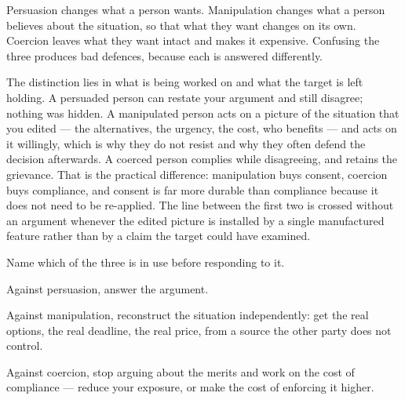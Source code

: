


\begin{core}
Persuasion changes what a person wants. Manipulation changes what a person believes about the situation, so that what they want changes on its own. Coercion leaves what they want intact and makes it expensive. Confusing the three produces bad defences, because each is answered differently.
\end{core}

\begin{mechanism}
The distinction lies in what is being worked on and what the target is left holding. A persuaded person can restate your argument and still disagree; nothing was hidden. A manipulated person acts on a picture of the situation that you edited --- the alternatives, the urgency, the cost, who benefits --- and acts on it willingly, which is why they do not resist and why they often defend the decision afterwards. A coerced person complies while disagreeing, and retains the grievance. That is the practical difference: manipulation buys consent, coercion buys compliance, and consent is far more durable than compliance because it does not need to be re-applied. The line between the first two is crossed without an argument whenever the edited picture is installed by a single manufactured feature rather than by a claim the target could have examined.
\end{mechanism}

\begin{application}
  \item Name which of the three is in use before responding to it.
  \item Against persuasion, answer the argument.
  \item Against manipulation, reconstruct the situation independently: get the real options, the real deadline, the real price, from a source the other party does not control.
  \item Against coercion, stop arguing about the merits and work on the cost of compliance --- reduce your exposure, or make the cost of enforcing it higher.
\end{application}

